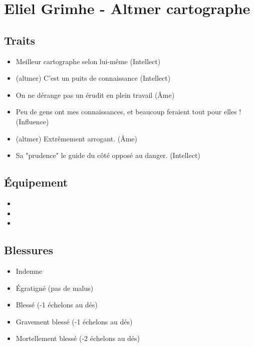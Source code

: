 \documentclass{Tamriel}
\begin{document}
\chapter*{Eliel Grimhe - Altmer cartographe}

\begin{multicols*}{2}
\raggedcolumns   

        \section*{Traits}

        \begin{itemize}
        \item Meilleur cartographe selon lui-même (Intellect)
        \item (altmer) C'est un puits de connaissance (Intellect)
        \item On ne dérange pas un érudit en plein travail (Âme)
        \item Peu de gens ont mes connaissances, et beaucoup feraient tout pour elles ! (Influence)
        \item (altmer) Extrêmement arrogant. (Âme)
        \item Sa "prudence" le guide du côté opposé au danger.  (Intellect)
        \end{itemize}
        
        \section*{Équipement}

        \begin{itemize}
        \item 
        \item 
        \item 
        \end{itemize}
        
        \section*{Blessures}

	\begin{itemize}
	\item Indemne
	\item Égratigné (pas de malus)
	\item Blessé (-1 échelons au dés)
	\item Gravement blessé (-1 échelons au dés)
	\item Mortellement blessé (-2 échelons au dés)
        \end{itemize}
        

\end{multicols*}
\end{document}
